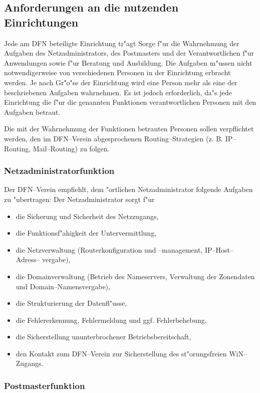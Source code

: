 \subsection{Anforderungen an die nutzenden Einrichtungen}

Jede am DFN beteiligte Einrichtung tr"agt Sorge f"ur die Wahrnehmung der
Aufgaben des Netzadministrators, des Postmasters und der Verantwortlichen
f"ur Anwendungen sowie f"ur Beratung und Ausbildung. Die Aufgaben m"ussen nicht
notwendigerweise von verschiedenen Personen in der Einrichtung erbracht
werden. Je nach Gr"o"se der Einrichtung wird eine Person mehr als eine der
beschriebenen Aufgaben wahrnehmen. Es ist jedoch erforderlich, da"s jede
Einrichtung die f"ur die genannten Funktionen verantwortlichen Personen mit
den Aufgaben betraut.

Die mit der Wahrnehmung der Funktionen betrauten Personen sollen
verpflichtet werden, den im DFN--Verein abgesprochenen Routing--Strategien (z.
B. IP--Routing, Mail--Routing) zu folgen.

\subsubsection{Netzadministratorfunktion}

Der DFN--Verein empfiehlt, dem "ortlichen Netzadministrator folgende Aufgaben
zu "ubertragen: Der Netzadministrator sorgt f"ur

\begin{itemize}
  \item die Sicherung und Sicherheit des Netzzugangs,
  \item die Funktionsf"ahigkeit der Untervermittlung,
  \item die Netzverwaltung (Routerkonfiguration und --management,
    IP--Host--Adress-- vergabe),
  \item die Domainverwaltung (Betrieb des Nameservers, Verwaltung der
    Zonendaten und Domain--Namensvergabe),
  \item die Strukturierung der Datenfl"usse,
  \item die Fehlererkennung, Fehlermeldung und ggf. Fehlerbehebung,
  \item die Sicherstellung ununterbrochener Betriebsbereitschaft,
  \item den Kontakt zum DFN--Verein zur Sicherstellung des st"orungsfreien
    WiN--Zugangs.
\end{itemize}

\subsubsection{Postmasterfunktion}

